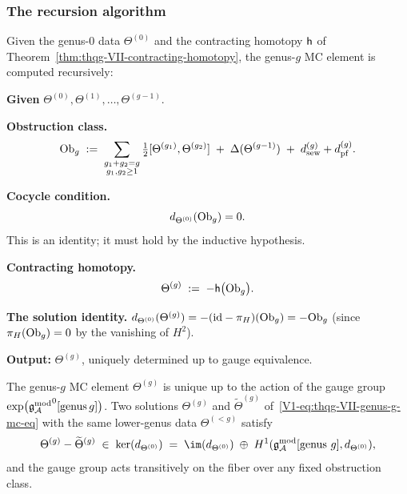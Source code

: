 \subsubsection{The recursion algorithm}

\begin{construction}
\label{constr:thqg-VII-mc-recursion}
Given the genus-$0$ data $\Theta^{(0)}$ and the contracting
homotopy $\mathsf{h}$ of
Theorem~\textup{\ref{thm:thqg-VII-contracting-homotopy}},
the genus-$g$ MC element is computed recursively:

\medskip
\noindent
\textbf{Given} $\Theta^{(0)}, \Theta^{(1)}, \ldots,
\Theta^{(g-1)}$.

\medskip
\noindent
\textbf{Obstruction class.}
\begin{equation}%
\Ob_g
\;:=\;
\sum_{\substack{g_1+g_2=g \\ g_1,g_2 \geq 1}}
\tfrac{1}{2}[\Theta^{(g_1)},\Theta^{(g_2)}]
\;+\;
\Delta(\Theta^{(g-1)})
\;+\;
\dsew^{(g)} + \dpf^{(g)}.
\end{equation}

\textbf{Cocycle condition.}
\begin{equation}%
d_{\Theta^{(0)}}(\Ob_g) = 0.
\end{equation}
This is an identity; it must hold by the inductive
hypothesis.

\textbf{Contracting homotopy.}
\begin{equation}%
\Theta^{(g)}
\;:=\;
-\hCont\bigl(\Ob_g\bigr).
\end{equation}

\textbf{The solution identity.}
$d_{\Theta^{(0)}}(\Theta^{(g)})
= -(\mathrm{id} - \pi_H)(\mathrm{Ob}_g)
= -\mathrm{Ob}_g$
(since $\pi_H(\mathrm{Ob}_g) = 0$ by the vanishing of $H^2$).

\medskip
\noindent
\textbf{Output:} $\Theta^{(g)}$, uniquely determined up to
gauge equivalence.
\end{construction}

\begin{theorem}
The genus-$g$ MC element $\Theta^{(g)}$ is unique up to the
action of the gauge group
$\exp\bigl({\mathfrak{g}_{\mathcal{A}}^{\mathrm{mod}}}^0[\mathrm{genus\,}g]\bigr)$.
Two solutions $\Theta^{(g)}$ and $\widetilde{\Theta}^{(g)}$
of~\eqref{V1-eq:thqg-VII-genus-g-mc-eq} with the same
lower-genus data $\Theta^{(<g)}$ satisfy
\begin{equation}%
\Theta^{(g)} - \widetilde{\Theta}^{(g)}
\;\in\;
\ker(d_{\Theta^{(0)}})
\;=\;
\im(d_{\Theta^{(0)}})
\;\oplus\;
H^1(\gAmod[\text{genus }g], d_{\Theta^{(0)}}),
\end{equation}
and the gauge group acts transitively on the fiber over any
fixed obstruction class.
\end{theorem}

